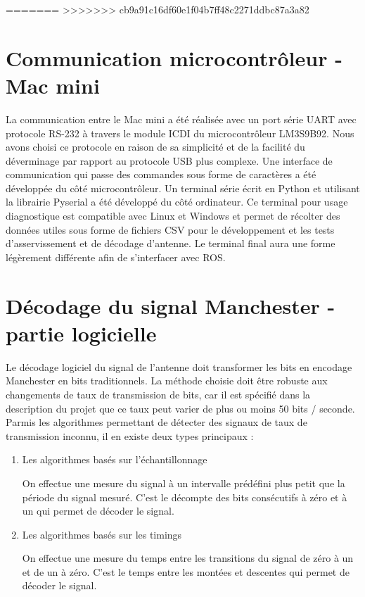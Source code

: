 =======
>>>>>>> cb9a91c16df60e1f04b7ff48c2271ddbc87a3a82

\section{Communication microcontrôleur - Mac mini}

La communication entre le Mac mini a été réalisée avec un port série UART avec protocole RS-232 à travers le module ICDI du microcontrôleur LM3S9B92. Nous avons choisi ce protocole en raison de sa simplicité et de la facilité du déverminage par rapport au protocole USB plus complexe. Une interface de communication qui passe des commandes sous forme de caractères a été développée du côté microcontrôleur. Un terminal série écrit en Python et utilisant la librairie Pyserial a été développé du côté ordinateur. Ce terminal pour usage diagnostique est compatible avec Linux et Windows et permet de récolter des données utiles sous forme de fichiers CSV pour le développement et les tests d'asservissement et de décodage d'antenne. Le terminal final aura une forme légèrement différente afin de s'interfacer avec ROS.

\section{Décodage du signal Manchester - partie logicielle}

Le décodage logiciel du signal de l'antenne doit transformer les bits en encodage Manchester en bits traditionnels. La méthode choisie doit être robuste aux changements de taux de transmission de bits, car il est spécifié dans la description du projet que ce taux peut varier de plus ou moins 50 bits / seconde. Parmis les algorithmes permettant de détecter des signaux de taux de transmission inconnu, il en existe deux types principaux : 

\begin{enumerate}
\item{Les algorithmes basés sur l'échantillonnage}

On effectue une mesure du signal à un intervalle prédéfini plus petit que la période du signal mesuré. C'est le décompte des bits consécutifs à zéro et à un qui permet de décoder le signal.

\item{Les algorithmes basés sur les timings} 

On effectue une mesure du temps entre les transitions du signal de zéro à un et de un à zéro. C'est le temps entre les montées et descentes qui permet de décoder le signal.
\end{enumerate}


